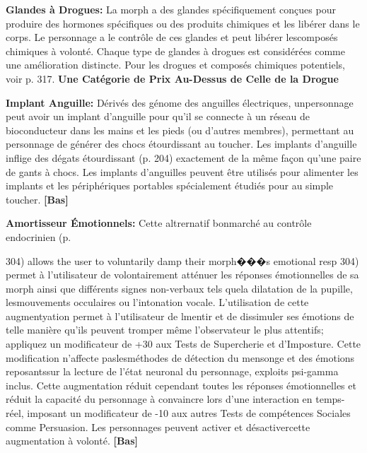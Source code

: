 {{\textbf{Glandes à Drogues:} La morph a des glandes spécifiquement conçues pour produire des hormones spécifiques ou des produits chimiques et les libérer dans le corps. Le personnage a le contrôle de ces glandes et peut libérer lescomposés chimiques à volonté. Chaque type de glandes à drogues est considérées comme une amélioration distincte. Pour les drogues et composés chimiques potentiels, voir p. 317. \textbf{{Une Catégorie de Prix Au-Dessus de Celle de la Drogue}} 

\textbf{Implant Anguille:} Dérivés des génome des anguilles électriques, unpersonnage peut avoir un implant d'anguille pour qu'il se connecte à un réseau de bioconducteur dans les mains et les pieds (ou d'autres membres), permettant au personnage de générer des chocs étourdissant au toucher. Les implants d'anguille inflige des dégats étourdissant (p. 204) exactement de la même façon qu'une paire de gants à chocs. Les implants d'anguilles peuvent être utilisés pour alimenter les implants et les périphériques portables spécialement étudiés pour au simple toucher. \textbf{[Bas]} 

\textbf{Amortisseur Émotionnels:} Cette altrernatif bonmarché au contrôle endocrinien (p.

304) allows the user to voluntarily damp their morph���s emotional resp 304) permet à l'utilisateur de volontairement atténuer les réponses émotionnelles de sa morph ainsi que différents signes non-verbaux tels quela dilatation de la pupille, lesmouvements occulaires ou l'intonation vocale. L'utilisation de cette augmentyation permet à l'utilisateur de lmentir et de dissimuler ses émotions de telle manière qu'ils peuvent tromper même l'observateur le plus attentifs; appliquez un modificateur de +30 aux Tests de Supercherie et d'Imposture. Cette modification n'affecte paslesméthodes de détection du mensonge et des émotions reposantssur la lecture de l'état neuronal du personnage, exploits psi-gamma inclus. Cette augmentation réduit cependant toutes les réponses émotionnelles et réduit la capacité du personnage à convaincre lors d'une interaction en temps-réel, imposant un modificateur de -10 aux autres Tests de compétences Sociales comme Persuasion. Les personnages peuvent activer et désactivercette augmentation à volonté. \textbf{[Bas]} 

}}
